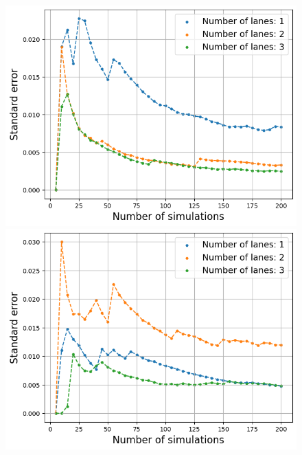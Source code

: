 \documentclass[a4paper,12pt]{article}
\begin{document}
\begin{figure}[H]
    \centering
    \begin{minipage}{.5\textwidth}
        \centering
        \includegraphics[scale=0.47]{Images/standard error 10 cars.png}
    \end{minipage}%
    \begin{minipage}{.5\textwidth}
        \centering
        \includegraphics[scale=0.47]{Images/standard error 20 cars.png}
    \end{minipage}
    \centering
    \begin{minipage}{.5\textwidth}
        \centering

\end{minipage}
\end{figure}
\end{document}
